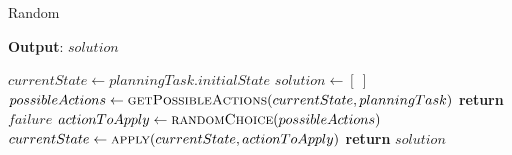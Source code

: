 \begin{algorithm}
	\caption{Random}
	\label{alg:random}
	\hspace*{0.5em} \textbf{Output}: $solution$
	\begin{algorithmic}[1]
		\State $currentState \gets planningTask.initialState$
		\State $solution \gets [\ ]$ 
		\State $possibleActions \gets \Call{getPossibleActions}{currentState, planningTask}$
		\State \textbf{return} $failure$ 
		\EndIf
		\State $actionToApply \gets \Call{randomChoice}{possibleActions}$
		\State $currentState \gets \Call{apply}{currentState, actionToApply}$
		\State {}
		\EndWhile
		\State \textbf{return} $solution$
		\EndProcedure
	\end{algorithmic}
\end{algorithm}

